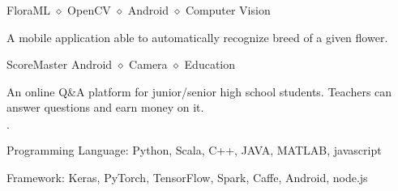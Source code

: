 \documentclass{joel_cv}
\begin{document}
\begin{proj}{Flora}{ML $\diamond$ OpenCV $\diamond$ Android $\diamond$ Computer Vision}
	\item A mobile application able to automatically recognize breed of a given flower.
\end{proj}

\begin{proj}{ScoreMaster}
	{Android $\diamond$ Camera $\diamond$ Education}
	\item An online Q\&A platform for junior/senior high school students. Teachers can answer questions and earn money on it.
\end{proj}

%
%

\begin{sectionItemize}{$\cdot$}
	\item Programming Language: Python, Scala, C++, JAVA, MATLAB, javascript
	\item Framework: Keras, PyTorch, TensorFlow, Spark, Caffe, Android, node.js
\end{sectionItemize}
\end{document}
